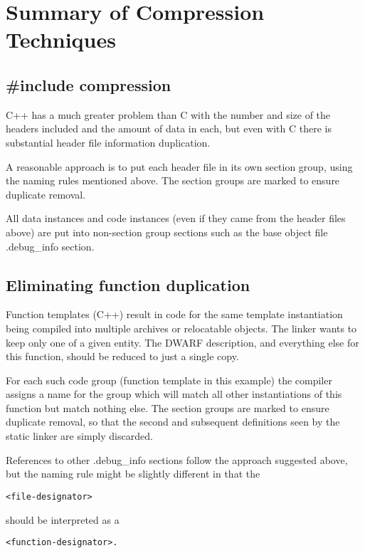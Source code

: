 \section{Summary of Compression Techniques}
\label{app:summaryofcompressiontechniques}
\subsection{\#include compression}
\label{app:includecompression}

C++ has a much greater problem than C with the number and
size of the headers included and the amount of data in each,
but even with C there is substantial header file information
duplication.

A reasonable approach is to put each header file in its own
section group, using the naming rules mentioned above. The
section groups are marked to ensure duplicate removal.

All data instances and code instances (even if they came
from the header files above) are put into non-section group
sections such as the base object file .debug\_info section.

\subsection{Eliminating function duplication}
\label{app:eliminatingfunctionduplication}


Function templates (C++) result in code for the same template
instantiation being compiled into multiple archives or
relocatable objects. The linker wants to keep only one of a
given entity. The DWARF description, and everything else for
this function, should be reduced to just a single copy.

For each such code group (function template in this example)
the compiler assigns a name for the group which will match
all other instantiations of this function but match nothing
else. The section groups are marked to ensure duplicate
removal, so that the second and subsequent definitions seen
by the static linker are simply discarded.


References to other .debug\_info sections follow the approach
suggested above, but the naming rule might be slightly
different in that the 
\begin{alltt}
<file-designator> 
\end{alltt}
should be interpreted
as a 
\begin{alltt}
<function-designator>.
\end{alltt}



